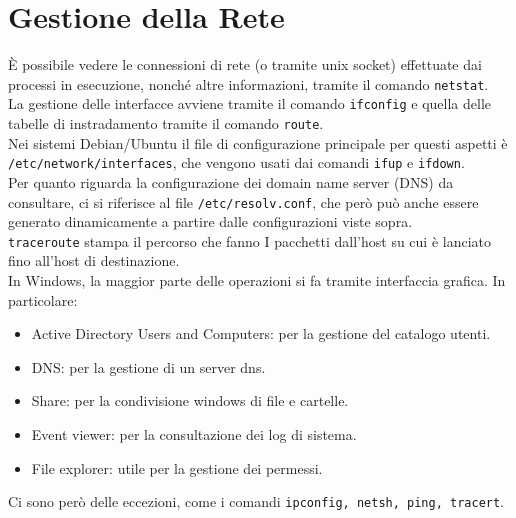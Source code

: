 \documentclass[a4paper]{report}
\begin{document}
\chapter{Gestione della Rete}
È possibile vedere le connessioni di rete (o tramite unix socket) effettuate dai processi in
esecuzione, nonché altre informazioni, tramite il comando \texttt{netstat}.\\
La gestione delle interfacce avviene tramite il comando \texttt{ifconfig} e quella delle tabelle di
instradamento tramite il comando \texttt{route}.\\
Nei sistemi Debian/Ubuntu il file di configurazione principale per questi aspetti è
\texttt{/etc/network/interfaces}, che vengono usati dai comandi \texttt{ifup} e \texttt{ifdown}.\\
Per quanto riguarda la configurazione dei domain name server (DNS) da consultare, ci si
riferisce al file \texttt{/etc/resolv.conf}, che però può anche essere generato
dinamicamente a partire dalle configurazioni viste sopra.\\
\texttt{traceroute} stampa il percorso che fanno I pacchetti dall’host su cui è lanciato fino
all'host di destinazione.\\
In Windows, la maggior parte delle operazioni si fa tramite
interfaccia grafica. In particolare:
\begin{itemize}
\item Active Directory Users and Computers: per la
gestione del catalogo utenti.
\item DNS: per la gestione di un server dns.
\item Share: per la condivisione windows di file e cartelle.
\item Event viewer: per la consultazione dei log di sistema.
\item File explorer: utile per la gestione dei permessi.
\end{itemize}
Ci sono però delle eccezioni, come i comandi \texttt{ipconfig, netsh, ping,
tracert}.\\
\end{document}

